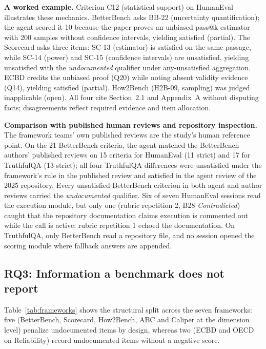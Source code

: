 \documentclass[10pt,conference]{IEEEtran}
\begin{document}
\textbf{A worked example.} Criterion C12 (statistical support) on HumanEval illustrates these mechanics. BetterBench asks BB-22 (uncertainty quantification); the agent scored it 10 because the paper proves an unbiased pass@k estimator with 200 samples without confidence intervals, yielding satisfied (partial). The Scorecard asks three items: SC-13 (estimator) is satisfied on the same passage, while SC-14 (power) and SC-15 (confidence intervals) are unsatisfied, yielding unsatisfied with the \emph{undocumented} qualifier under any-unsatisfied aggregation. ECBD credits the unbiased proof (Q20) while noting absent validity evidence (Q14), yielding satisfied (partial). How2Bench (H2B-09, sampling) was judged inapplicable (open). All four cite Section~2.1 and Appendix~A without disputing facts; disagreements reflect required evidence and item allocation.

\textbf{Comparison with published human reviews and repository inspection.} The framework teams' own published reviews are the study's human reference point. On the 21 BetterBench criteria, the agent matched the BetterBench authors' published reviews on 15 criteria for HumanEval (11 strict) and 17 for TruthfulQA (13 strict); all four TruthfulQA differences were unsatisfied under the framework's rule in the published review and satisfied in the agent review of the 2025 repository. Every unsatisfied BetterBench criterion in both agent and author reviews carried the \emph{undocumented} qualifier. Six of seven HumanEval sessions read the execution module, but only one (rubric repetition 2, B28 \emph{Contradicted}) caught that the repository documentation claims execution is commented out while the call is active; rubric repetition 1 echoed the documentation. On TruthfulQA, only BetterBench read a repository file, and no session opened the scoring module where fallback answers are appended.

\subsection{RQ3: Information a benchmark does not report}
\label{sec:rq3}
Table~\ref{tab:frameworks} shows the structural split across the seven frameworks: five (BetterBench, Scorecard, How2Bench, ABC and Caliper at the dimension level) penalize undocumented items by design, whereas two (ECBD and OECD on Reliability) record undocumented items without a negative score.
\end{document}
